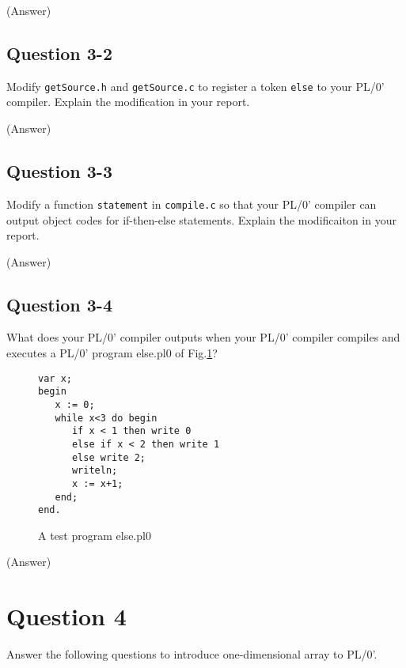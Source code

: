 \documentclass{article}
\begin{document}
\ifreport
(Answer)\\
\fi




\subsection*{Question 3-2}
Modify {\tt getSource.h} and {\tt getSource.c} to register a token
{\tt else} to your PL/0' compiler.
Explain the modification in your report.

\ifreport
(Answer)\\
\fi




\subsection*{Question 3-3}
Modify a function {\tt statement} in {\tt compile.c}
so that your PL/0' compiler can output object codes for if-then-else statements.
Explain the modificaiton in your report.

\ifreport
(Answer)\\
\fi




\subsection*{Question 3-4}
What does your PL/0' compiler outputs when your PL/0' compiler compiles
and executes a PL/0' program else.pl0 of Fig.\ref{fig:if-then-else}?

\begin{figure}[h]
\begin{verbatim}
var x;
begin
   x := 0;
   while x<3 do begin
      if x < 1 then write 0
      else if x < 2 then write 1
      else write 2;
      writeln;
      x := x+1;
   end;
end.
\end{verbatim}
\caption{A test program else.pl0}\label{fig:if-then-else}
\end{figure}


\ifreport
(Answer)\\
\fi



\newpage
\section*{Question 4}
Answer the following questions to introduce one-dimensional array to PL/0'.
\end{document}
